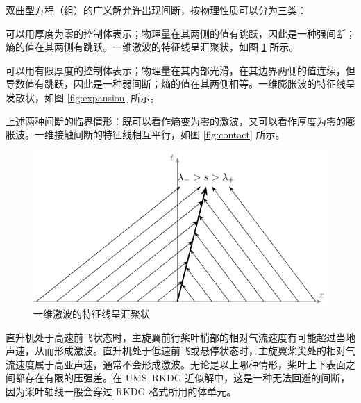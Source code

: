 双曲型方程（组）的广义解允许出现间断，按物理性质可以分为三类：
\begin{description}[wide]
\item [{激波}] 可以用厚度为零的控制体表示；物理量在其两侧的值有跳跃，因此是一种强间断；熵的值在其两侧有跳跃。一维激波的特征线呈汇聚状，如图
\ref{fig:shock} 所示。
\item [{膨胀波}] 可以用有限厚度的控制体表示；物理量在其内部光滑，在其边界两侧的值连续，但导数值有跳跃，因此是一种弱间断；熵的值在其两侧相等。一维膨胀波的特征线呈发散状，如图
\ref{fig:expansion} 所示。
\item [{接触间断}] 上述两种间断的临界情形：既可以看作熵变为零的激波，又可以看作厚度为零的膨胀波。一维接触间断的特征线相互平行，如图
\ref{fig:contact} 所示。
\end{description}
%
\begin{figure}[h!]
\begin{centering}
\includegraphics[width=1\textheight,height=0.26\textheight,keepaspectratio]{figures/shock}
\par\end{centering}
\caption{\label{fig:shock}一维激波的特征线呈汇聚状}
\end{figure}

直升机处于高速前飞状态时，主旋翼前行桨叶梢部的相对气流速度有可能超过当地声速，从而形成激波。直升机处于低速前飞或悬停状态时，主旋翼桨尖处的相对气流速度属于高亚声速，通常不会形成激波。无论是以上哪种情形，桨叶上下表面之间都存在有限的压强差。在
UMS–RKDG 近似解中，这是一种无法回避的间断，因为桨叶轴线一般会穿过 RKDG 格式所用的体单元。

